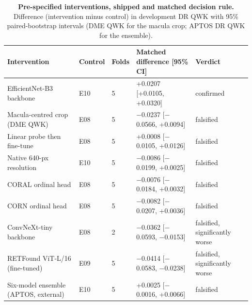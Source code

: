\begin{table}[h]
\caption{\textbf{Pre-specified interventions, shipped and matched decision rule.}
Difference (intervention minus control) in development DR QWK with 95\% paired-bootstrap
intervals (DME QWK for the macula crop; APTOS DR QWK for the ensemble).}\label{tab:s3}
\centering\scriptsize
\begin{tabular}{@{}lllll@{}}
\toprule
Intervention & Control & Folds & Matched difference [95\% CI] & Verdict \\
\midrule
EfficientNet-B3 backbone & E10 & 5 & +0.0207 [+0.0105, +0.0320] & confirmed \\
Macula-centred crop (DME QWK) & E08 & 5 & $-$0.0237 [$-$0.0566, +0.0094] & falsified \\
Linear probe then fine-tune & E08 & 5 & +0.0008 [$-$0.0105, +0.0126] & falsified \\
Native 640-px resolution & E10 & 5 & $-$0.0086 [$-$0.0199, +0.0025] & falsified \\
CORAL ordinal head & E08 & 5 & $-$0.0076 [$-$0.0184, +0.0032] & falsified \\
CORN ordinal head & E08 & 5 & $-$0.0082 [$-$0.0207, +0.0036] & falsified \\
ConvNeXt-tiny backbone & E08 & 2 & $-$0.0362 [$-$0.0593, $-$0.0153] & falsified, significantly worse \\
RETFound ViT-L/16 (fine-tuned) & E09 & 5 & $-$0.0414 [$-$0.0583, $-$0.0238] & falsified, significantly worse \\
Six-model ensemble (APTOS, external) & E10 & 5 & +0.0025 [$-$0.0016, +0.0066] & falsified \\
\bottomrule
\end{tabular}
\end{table}
